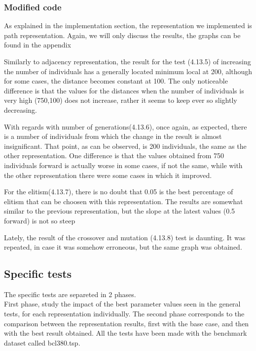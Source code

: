 \subsubsection{Modified code}

As explained in the implementation section, the representation we
implemented is path representation. Again, we will only discuss the
results, the graphs can be found in the appendix

Similarly to adjacency representation, the result for the test (4.13.5)
of increasing the number of individuals has a generally located minimum local at
200, although for some cases, the distance becomes constant at 100. The only
noticeable difference is that the values for the distances when the number of
individuals is very high (750,100) does not increase, rather it seems to keep
ever so slightly decreasing.

With regards with number of generations(4.13.6), once again, as expected, there is a number of individuals from which the
change in the result is almost insignificant. That point, as can be observed, is 200
individuals, the same as the other representation. One difference is that the
values obtained from 750 individuals forward is actually worse in some
cases, if not the same, while with the other representation there were some
cases in which it improved.

For the elitism(4.13.7), there is no doubt that 0.05 is the best
percentage of elitism that can be choosen with this representation. The results
are somewhat similar to the previous representation, but the slope at the
latest values (0.5 forward) is not so steep

Lately, the result of the crossover and mutation (4.13.8)  test is daunting. It was repeated, in case it was somehow erroneous, but the same graph was obtained.
\\

\subsection{Specific tests}

The specific tests are separeted in 2 phases.\\
 First phase, study the impact of the best parameter values seen in the general
tests, for each representation individually. The second phase
corresponds to the comparison between the representation results, first with the
base case, and then with the best result obtained.
All the tests have been made with the benchmark dataset called bcl380.tsp.

